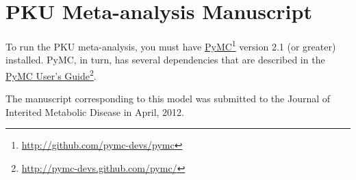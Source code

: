 \part{PKU Meta-analysis Manuscript}
\label{pkumeta-analysismanuscript}

To run the PKU meta-analysis, you must have \href{http://github.com/pymc-devs/pymc}{PyMC}\footnote{\href{http://github.com/pymc-devs/pymc}{http:/\slash github.com\slash pymc-devs\slash pymc}} version 2.1 (or greater) installed. PyMC, in turn, has several dependencies that are described in the \href{http://pymc-devs.github.com/pymc/}{PyMC User's Guide}\footnote{\href{http://pymc-devs.github.com/pymc/}{http:/\slash pymc-devs.github.com\slash pymc\slash }}.

The manuscript corresponding to this model was submitted to the Journal of Interited Metabolic Disease in April, 2012.
